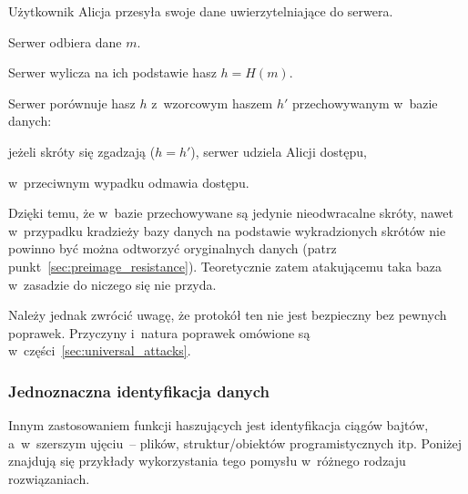 \documentclass[12pt,a4paper,twoside]{article}
\begin{document}
\begin{myenumerate}

    \item Użytkownik Alicja przesyła swoje dane uwierzytelniające do serwera.

    \item Serwer odbiera dane $m$.

    \item Serwer wylicza na ich podstawie hasz $h = H(m)$.

    \item Serwer porównuje hasz $h$ z~wzorcowym haszem $h'$ przechowywanym
    w~bazie danych:

    \begin{myenumerate}

        \item jeżeli skróty się zgadzają ($h = h'$), serwer udziela Alicji
        dostępu,

        \item w~przeciwnym wypadku odmawia dostępu.

    \end{myenumerate}

\end{myenumerate}

Dzięki temu, że w~bazie przechowywane są jedynie nieodwracalne skróty, nawet
w~przypadku kradzieży bazy danych na podstawie wykradzionych skrótów nie
powinno być można odtworzyć oryginalnych danych (patrz
punkt~\ref{sec:preimage_resistance}). Teoretycznie zatem atakującemu taka baza
w~zasadzie do niczego się nie przyda.

Należy jednak zwrócić uwagę, że protokół ten nie jest bezpieczny bez pewnych
poprawek. Przyczyny i~natura poprawek omówione są
w~części~\ref{sec:universal_attacks}.



\subsubsection{Jednoznaczna identyfikacja danych}
Innym zastosowaniem funkcji haszujących jest identyfikacja ciągów bajtów,
a~w~szerszym ujęciu~-- plików, struktur/obiektów programistycznych itp. Poniżej
znajdują się przykłady wykorzystania tego pomysłu w~różnego rodzaju
rozwiązaniach.
\end{document}
